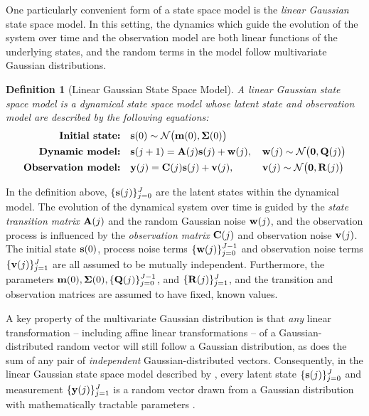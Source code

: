 \documentclass[10pt]{article}
\newtheorem{definition}{Definition}[section]
\numberwithin{equation}{section}
\begin{document}
One particularly convenient form of a state space model is the \emph{linear Gaussian} state space model. In this setting, the dynamics which guide the evolution of the system over time and the observation model are both linear functions of the underlying states, and the random terms in the model follow multivariate Gaussian distributions.

\begin{definition}[Linear Gaussian State Space Model]
\label{def:LGSSM}
    A linear Gaussian state space model is a dynamical state space model whose latent state and observation model are described by the following equations:
    \begin{subequations}
        \label{eq:LGSSM-dynamics}
        \begin{align}
            \textnormal{\textbf{Initial state:}} \quad & \bfs(0) \sim \calN\big(\bfm(0), \bfSigma(0)\big) && \label{eq:LGSSM-init}\\%
            \textnormal{\textbf{Dynamic model:}} \quad & \bfs(j+1) = \bfA(j)\bfs(j) + \bfw(j), \, && \bfw(j) \sim \calN\big(\mathbf{0}, \bfQ(j)\big) \label{eq:LGSSM-evolution}\\%
            \textnormal{\textbf{Observation model:}} \quad & \bfy(j) = \bfC(j)\bfs(j) + \bfv(j), \, && \bfv(j) \sim \calN\big(\mathbf{0}, \bfR(j)\big) \label{eq:LGSSM-observe}
        \end{align}
    \end{subequations}
\end{definition}
In the definition above, $\{\mathbf{s}(j)\}_{j=0}^{J}$ are the latent states within the dynamical model. The evolution of the dynamical system over time is guided by the \emph{state transition matrix} $\mathbf{A}(j)$ and the random Gaussian noise $\mathbf{w}(j)$, and the observation process is influenced by the \emph{observation matrix} $\mathbf{C}(j)$ and observation noise $\mathbf{v}(j)$. The initial state $\mathbf{s}(0)$, process noise terms $\{\mathbf{w}(j)\}_{j=0}^{J-1}$ and observation noise terms $\{\mathbf{v}(j)\}_{j=1}^{J}$ are all assumed to be mutually independent. Furthermore, the parameters $\mathbf{m}(0), \bm{\Sigma}(0), \{\mathbf{Q}(j)\}_{j=0}^{J-1}$, and $\{\mathbf{R}(j)\}_{j=1}^{J}$, and the transition and observation matrices are assumed to have fixed, known values. 

A key property of the multivariate Gaussian distribution is that \emph{any} linear transformation -- including affine linear transformations -- of a Gaussian-distributed random vector will still follow a Gaussian distribution, as does the sum of any pair of \emph{independent} Gaussian-distributed vectors. Consequently, in the linear Gaussian state space model described by , every latent state $\{\mathbf{s}(j)\}_{j=0}^{J}$ and measurement $\{\mathbf{y}(j)\}_{j=1}^{J}$ is a random vector drawn from a Gaussian distribution with mathematically tractable parameters \citep{Bayesian-Filter-Book-2023}.
\end{document}
